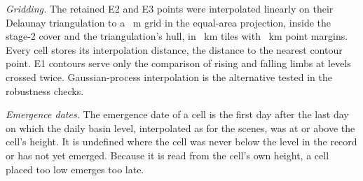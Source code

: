 \emph{Gridding.} The retained E2 and E3 points were interpolated linearly on their Delaunay triangulation to a ~m grid in the equal-area projection, inside the stage-2 cover and the triangulation's hull, in ~km tiles with ~km point margins. Every cell stores its interpolation distance, the distance to the nearest contour point. E1 contours serve only the comparison of rising and falling limbs at levels crossed twice. Gaussian-process interpolation is the alternative tested in the robustness checks.

\emph{Emergence dates.} The emergence date of a cell is the first day after the last day on which the daily basin level, interpolated as for the scenes, was at or above the cell's height. It is undefined where the cell was never below the level in the record or has not yet emerged. Because it is read from the cell's own height, a cell placed too low emerges too late.
